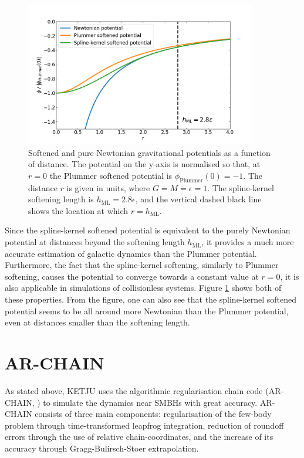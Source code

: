 \documentclass[english, twoside]{HYgradu}
\begin{document}
\begin{figure}
	\centering	
	\includegraphics[width=0.9\textwidth]{softened_potentials.png}	
	\caption{Softened and pure Newtonian gravitational potentials as a function of distance. The potential on the y-axis is normalised so that, at $r=0$ the Plummer softened potential is $\phi_\mathrm{Plummer}(0) = -1$. The distance $r$ is given in units, where $G = M = \epsilon = 1$. The spline-kernel softening length is $h_\mathrm{ML} = 2.8 \epsilon$, and the vertical dashed black line shows the location at which $r = h_\mathrm{ML}$.}
	\label{figure:softened_potentials}
\end{figure}

Since the spline-kernel softened potential is equivalent to the purely Newtonian potential at distances beyond the softening length $h_\mathrm{ML}$, it provides a much more accurate estimation of galactic dynamics than the Plummer potential. Furthermore, the fact that the spline-kernel softening, similarly to Plummer softening, causes the potential to converge towards a constant value at $r=0$, it is also applicable in simulations of collisionless systems. Figure \ref{figure:softened_potentials} shows both of these properties. From the figure, one can also see that the spline-kernel softened potential seems to be all around more Newtonian than the Plummer potential, even at distances smaller than the softening length.


\section{AR-CHAIN} \label{section:ar-chain}

As stated above, KETJU uses the algorithmic regularisation chain code (AR-CHAIN, \citealt{Mikkola2008ARCHAIN}) to simulate the dynamics near SMBHs with great accuracy. AR-CHAIN consists of three main components: regularisation of the few-body problem through time-transformed leapfrog integration, reduction of roundoff errors through the use of relative chain-coordinates, and the increase of its accuracy through Gragg-Bulirsch-Stoer extrapolation.
\end{document}
